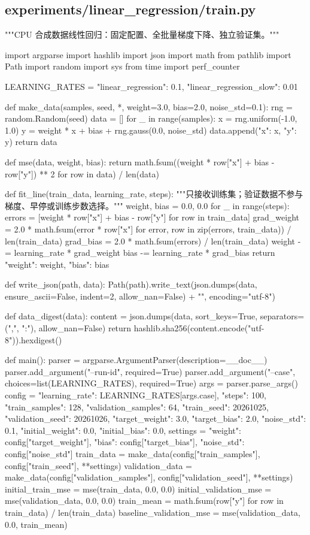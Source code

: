 \subsection{experiments/linear\_regression/train.py}

\begin{Code}
"""CPU 合成数据线性回归：固定配置、全批量梯度下降、独立验证集。"""

import argparse
import hashlib
import json
import math
from pathlib import Path
import random
import sys
from time import perf_counter


LEARNING_RATES = {"linear_regression": 0.1, "linear_regression_slow": 0.01}


def make_data(samples, seed, *, weight=3.0, bias=2.0, noise_std=0.1):
    rng = random.Random(seed)
    data = []
    for _ in range(samples):
        x = rng.uniform(-1.0, 1.0)
        y = weight * x + bias + rng.gauss(0.0, noise_std)
        data.append({"x": x, "y": y})
    return data


def mse(data, weight, bias):
    return math.fsum((weight * row["x"] + bias - row["y"]) ** 2 for row in data) / len(data)


def fit_line(train_data, learning_rate, steps):
    """只接收训练集；验证数据不参与梯度、早停或训练步数选择。"""
    weight, bias = 0.0, 0.0
    for _ in range(steps):
        errors = [weight * row["x"] + bias - row["y"] for row in train_data]
        grad_weight = 2.0 * math.fsum(error * row["x"] for error, row in zip(errors, train_data)) / len(train_data)
        grad_bias = 2.0 * math.fsum(errors) / len(train_data)
        weight -= learning_rate * grad_weight
        bias -= learning_rate * grad_bias
    return {"weight": weight, "bias": bias}


def write_json(path, data):
    Path(path).write_text(json.dumps(data, ensure_ascii=False, indent=2, allow_nan=False) + "\n", encoding="utf-8")


def data_digest(data):
    content = json.dumps(data, sort_keys=True, separators=(",", ":"), allow_nan=False)
    return hashlib.sha256(content.encode("utf-8")).hexdigest()


def main():
    parser = argparse.ArgumentParser(description=__doc__)
    parser.add_argument("--run-id", required=True)
    parser.add_argument("--case", choices=list(LEARNING_RATES), required=True)
    args = parser.parse_args()
    config = {
        "learning_rate": LEARNING_RATES[args.case], "steps": 100,
        "train_samples": 128, "validation_samples": 64,
        "train_seed": 20261025, "validation_seed": 20261026,
        "target_weight": 3.0, "target_bias": 2.0, "noise_std": 0.1,
        "initial_weight": 0.0, "initial_bias": 0.0,
    }
    settings = {"weight": config["target_weight"], "bias": config["target_bias"], "noise_std": config["noise_std"]}
    train_data = make_data(config["train_samples"], config["train_seed"], **settings)
    validation_data = make_data(config["validation_samples"], config["validation_seed"], **settings)
    initial_train_mse = mse(train_data, 0.0, 0.0)
    initial_validation_mse = mse(validation_data, 0.0, 0.0)
    train_mean = math.fsum(row["y"] for row in train_data) / len(train_data)
    baseline_validation_mse = mse(validation_data, 0.0, train_mean)


\end{Code}
